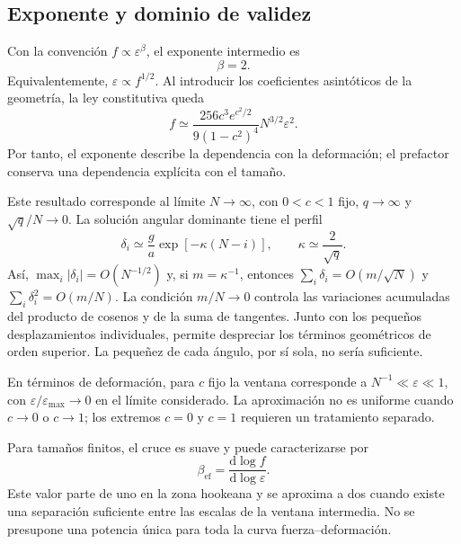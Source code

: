 \documentclass[11pt,a4paper]{article}
\begin{document}
\subsection{Exponente y dominio de validez}

Con la convención $f\propto\varepsilon^\beta$, el exponente
intermedio es
\begin{equation}
\boxed{\beta=2.}
\label{eq:nonhookean_exponent}
\end{equation}
Equivalentemente, $\varepsilon\propto f^{1/2}$. Al introducir
los coeficientes asintóticos de la geometría, la ley constitutiva queda
\begin{equation}
f\simeq
\frac{256c^3e^{c^2/2}}{9(1-c^2)^4}
N^{3/2}\varepsilon^2.
\label{eq:nonhookean_size_scaling}
\end{equation}
Por tanto, el exponente describe la dependencia con la deformación;
el prefactor conserva una dependencia explícita con el tamaño.

Este resultado corresponde al límite $N\to\infty$, con
$0<c<1$ fijo, $q\to\infty$ y $\sqrt q/N\to0$.
La solución angular dominante tiene el perfil
\begin{equation}
\delta_i\simeq\frac ga\exp[-\kappa(N-i)],
\qquad \kappa\simeq\frac{2}{\sqrt q}.
\label{eq:intermediate_profile}
\end{equation}
Así, $\max_i|\delta_i|=O(N^{-1/2})$ y, si
$m=\kappa^{-1}$, entonces
$\sum_i\delta_i=O(m/\sqrt N)$ y
$\sum_i\delta_i^2=O(m/N)$. La condición $m/N\to0$ controla
las variaciones acumuladas del producto de cosenos y de la suma
de tangentes. Junto con los pequeños desplazamientos individuales,
permite despreciar los términos geométricos de orden superior.
La pequeñez de cada ángulo, por sí sola, no sería suficiente.

En términos de deformación, para $c$ fijo la ventana corresponde a
$N^{-1}\ll\varepsilon\ll1$, con
$\varepsilon/\varepsilon_{\max}\to0$ en el límite considerado.
La aproximación no es uniforme cuando $c\to0$ o $c\to1$;
los extremos $c=0$ y $c=1$ requieren un tratamiento separado.

Para tamaños finitos, el cruce es suave y puede caracterizarse por
\begin{equation}
\beta_{\mathrm{ef}}=
\frac{\mathrm d\log f}{\mathrm d\log\varepsilon}.
\end{equation}
Este valor parte de uno en la zona hookeana y se aproxima a dos
cuando existe una separación suficiente entre las escalas de la
ventana intermedia. No se presupone una potencia única para toda
la curva fuerza--deformación.
\end{document}
